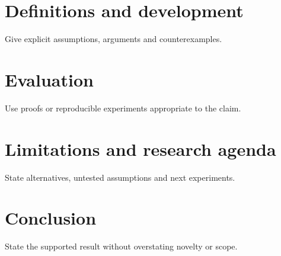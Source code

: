 \documentclass[11pt]{article}
\begin{document}
\section{Definitions and development}Give explicit assumptions, arguments and counterexamples.
\section{Evaluation}Use proofs or reproducible experiments appropriate to the claim.
\section{Limitations and research agenda}State alternatives, untested assumptions and next experiments.
\section{Conclusion}State the supported result without overstating novelty or scope.
% 
\end{document}
